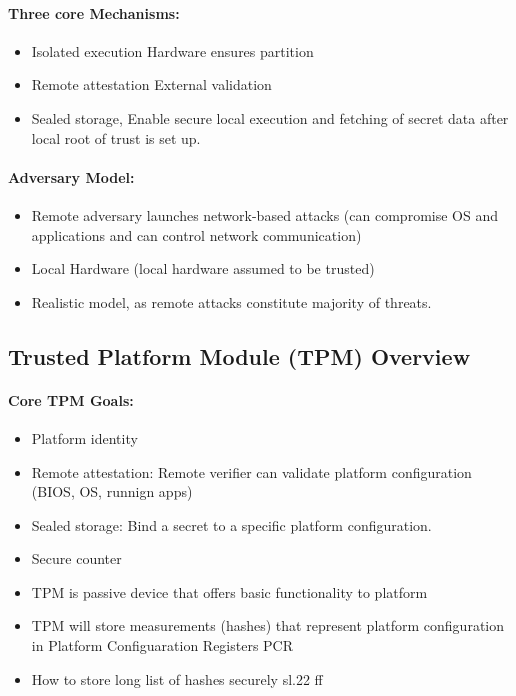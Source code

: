 \paragraph{Three core Mechanisms: }
\begin{itemize}

\item Isolated execution Hardware ensures partition
\item Remote attestation External validation
\item Sealed storage, Enable secure local execution and fetching of secret data after local root of trust is set up.
\end{itemize}{}

\paragraph{Adversary Model:}
\begin{itemize}
    \item Remote adversary launches network-based attacks (can compromise OS and applications and can control network communication)
    \item Local Hardware (local hardware assumed to be trusted)
    \item Realistic model, as remote attacks constitute majority of threats.
\end{itemize}{}

\subsection{Trusted Platform Module (TPM) Overview}

\paragraph{Core TPM Goals: }
\begin{itemize}
    \item[] Platform identity
    \item[] Remote attestation: Remote verifier can validate platform configuration (BIOS, OS, runnign apps)
    \item[] Sealed storage: Bind a secret to a specific platform configuration.
    \item[] Secure counter
    \item[] TPM is passive device that offers basic functionality to platform
    \item[] TPM will store measurements (hashes) that represent platform configuration in Platform Configuaration Registers PCR
    \item[] How to store long list of hashes securely sl.22 ff
\end{itemize}{}

